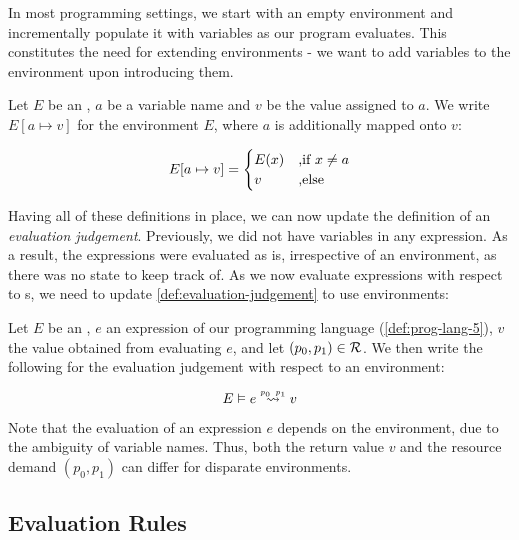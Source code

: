 In most programming settings, we start with an empty environment and incrementally populate it with variables as our program evaluates. This constitutes the need for extending environments - we want to add variables to the environment upon introducing them.

\begin{definition}\label{def:environment-augment}	
   Let \(E\) be an , \(a\) be a variable name and \(v\) be the value assigned to \(a\). We write \(E[a \mapsto v]\) for the environment \(E\), where \(a\) is additionally mapped onto \(v\):

   \[
      E[a \mapsto v] = 
      \begin{cases}
	 E(x)  & \mbox{,if } x \neq a\\
	 v     & \mbox{,else } 
      \end{cases}
   \]

\end{definition}

Having all of these definitions in place, we can now update the definition of an \emph{evaluation judgement}. Previously, we did not have variables in any expression. As a result, the expressions were evaluated as is, irrespective of an environment, as there was no state to keep track of. As we now evaluate expressions with respect to s, we need to update \cref{def:evaluation-judgement} to use environments:

\begin{definition}\label{def:eval-judgement-environments}
   Let \(E\) be an , \(e\) an expression of our programming language (\cref{def:prog-lang-5}), \(v\) the value obtained from evaluating \(e\), and let \((p_0, p_1) \in \mathcal{R}\). We then write the following for the evaluation judgement with respect to an environment:

   \[
      \evals{E}{e}{v}{p_0}{p_1}
   \]
	
\end{definition}

\begin{remark}
   Note that the evaluation of an expression \(e\) depends on the environment, due to the ambiguity of variable names. Thus, both the return value \(v\) and the resource demand \((p_0, p_1)\) can differ for disparate environments. 
\end{remark}

\subsection{Evaluation Rules}

